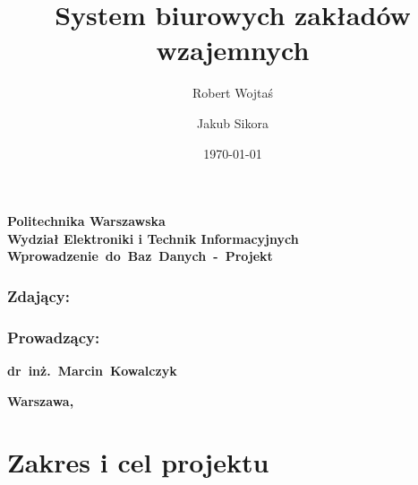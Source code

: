 \documentclass{mwrep}[15pt]
\title{\bf System biurowych zakładów wzajemnych \vskip 0.1cm}
\author{Robert Wojtaś \and Jakub Sikora}
\date{\today}
\begin{document}
\makeatletter
\renewcommand{\maketitle}{\begin{titlepage}
		\begin{center}{
				\LARGE {\bf Politechnika Warszawska}}\\
			\vspace{0.4cm}
			{\LARGE {\bf Wydział Elektroniki i Technik Informacyjnych}}\\
			\vspace{5cm}
			{\bf \LARGE \mbox{Wprowadzenie do Baz Danych - Projekt} \vskip 0.1cm}
		\end{center}
		\vspace{0.1cm}

		\begin{center}
			{\bf \LARGE \@title}
		\end{center}

		\vspace{10cm}
		\begin{paracol}{2}
			\addtocontents{toc}{\protect\setcounter{tocdepth}{1}}
			\subsection*{Zdający:}
			\bf{ \Large{ \noindent\@author \par}}
			\addtocontents{toc}{\protect\setcounter{tocdepth}{2}}

			\switchcolumn \addtocontents{toc}{\protect\setcounter{tocdepth}{1}}
			\subsection*{Prowadzący:}
			\bf{\Large{\noindent \mbox{dr inż. Marcin Kowalczyk}}}
			\addtocontents{toc}{\protect\setcounter{tocdepth}{2}}

		\end{paracol}
		\vspace*{\stretch{6}}
		\begin{center}
			\bf{\large{Warszawa, \@date\vskip 0.1cm}}
		\end{center}
	\end{titlepage}
}
\makeatother
\maketitle

\tableofcontents

\chapter{Zakres i cel projektu}
\end{document}

